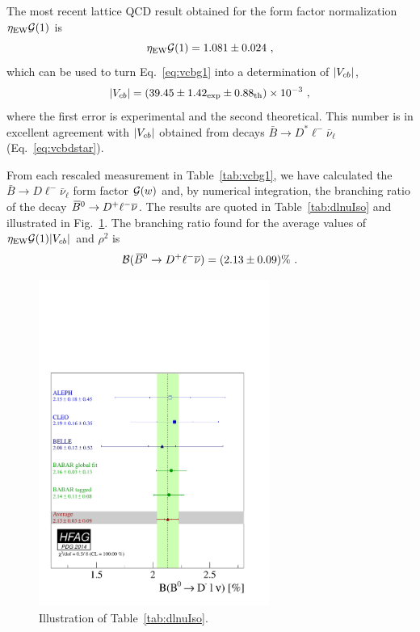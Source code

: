 The most recent lattice QCD result obtained for the form factor
normalization $\eta_\mathrm{EW}{\cal G}(1)$ is~\cite{Okamoto:2004xg}
\begin{equation}
  \eta_\mathrm{EW}{\cal G}(1) = 1.081\pm 0.024~,
\end{equation}
which can be used to turn Eq.~\ref{eq:vcbg1} into a determination of
$|V_{cb}|$,
\begin{equation}
  |V_{cb}| = (39.45\pm 1.42_{\rm exp}\pm 0.88_{\rm th})\times 10^{-3}~,
\end{equation}
where the first error is experimental and the second theoretical. This
number is in excellent agreement with $|V_{cb}|$ obtained from decays
$\bar B\to D^*\ell^-\bar\nu_\ell$ (Eq.~\ref{eq:vcbdstar}).

From each rescaled measurement in Table~\ref{tab:vcbg1}, we have
calculated the $\bar B\to D\ell^-\bar\nu_\ell$ form factor ${\cal
  G}(w)$ and, by numerical integration, the branching ratio of the
decay $\kern 0.18em\overline{\kern -0.18em B}{}^0 \to D^{+}\ell^{-}\overline{\nu}$. The results are quoted in Table~\ref{tab:dlnuIso} and
illustrated in Fig.~\ref{fig:brdlIso}. The branching ratio found for
the average values of $\eta_\mathrm{EW}{\cal G}(1)|V_{cb}|$ and $\rho^2$ is
\begin{equation}
  {\cal B}(\kern 0.18em\overline{\kern -0.18em B}{}^0 \to D^{+}\ell^{-}\overline{\nu})=(2.13\pm 0.09)\%~.
\end{equation}

\begin{figure}[!ht]
  \begin{center}
    \includegraphics[width=7.55cm]{figures/slb/br_dl_iso.pdf}
    \caption{Illustration of Table~\ref{tab:dlnuIso}.} \label{fig:brdlIso}
  \end{center}
\end{figure}

